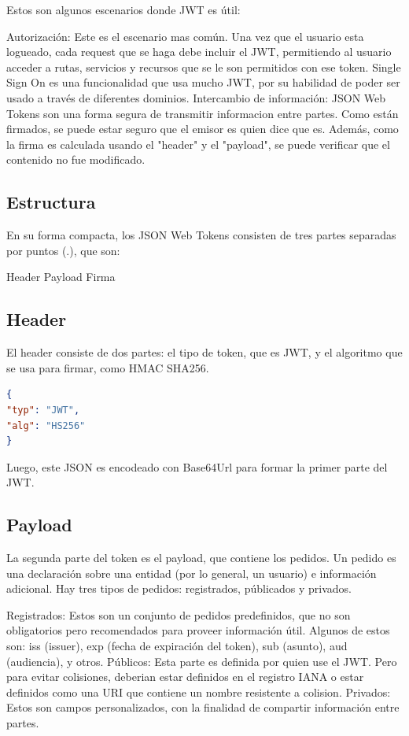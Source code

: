 Estos son algunos escenarios donde JWT es útil:
\begin{outline}
    \1 Autorización: Este es el escenario mas común. Una vez que el usuario esta logueado, cada request que se haga debe incluir el JWT, permitiendo al usuario acceder a rutas, servicios y recursos que se le son permitidos con ese token. Single Sign On es una funcionalidad que usa mucho JWT, por su habilidad de poder ser usado a través de diferentes dominios.
    \1 Intercambio de información: JSON Web Tokens son una forma segura de transmitir informacion entre partes. Como están firmados, se puede estar seguro que el emisor es quien dice que es. Además, como la firma es calculada usando el "header" y el "payload", se puede verificar que el contenido no fue modificado.
\end{outline}
\subsection[Estructura]{Estructura}


En su forma compacta, los JSON Web Tokens consisten de tres partes separadas por puntos (.), que son:
\begin{outline}
    \2 Header
    \2 Payload
    \2 Firma
\end{outline}

\subsection[Header]{Header}

El header consiste de dos partes: el tipo de token, que es JWT, y el algoritmo que se usa para firmar, como HMAC SHA256.

\begin{lstlisting}[language=json,firstnumber=1]
{
"typ": "JWT",
"alg": "HS256"
}
\end{lstlisting}
Luego, este JSON es encodeado con Base64Url para formar la primer parte del JWT.

\subsection[Payload]{Payload}

La segunda parte del token es el payload, que contiene los pedidos. Un pedido es una declaración sobre una entidad (por lo general, un usuario) e información adicional. Hay tres tipos de pedidos: registrados, públicados y privados.

\begin{outline}
    \1 Registrados: Estos son un conjunto de pedidos predefinidos, que no son obligatorios pero recomendados para proveer información útil. Algunos de estos son: iss (issuer), exp (fecha de expiración del token), sub (asunto), aud (audiencia), y otros.
    \1 Públicos: Esta parte es definida por quien use el JWT. Pero para evitar colisiones, deberian estar definidos en el registro IANA o estar definidos como una URI que contiene un nombre resistente a colision.
    \1 Privados: Estos son campos personalizados, con la finalidad de compartir información entre partes.
\end{outline}


